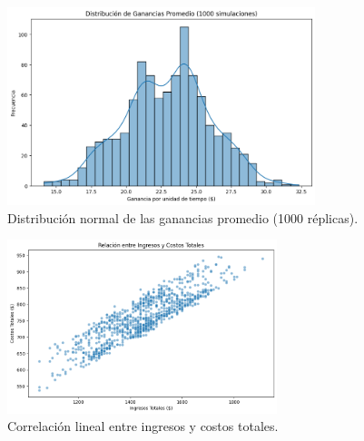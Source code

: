 \documentclass{report}
\begin{document}
\begin{figure}[h]
    \centering
    \includegraphics[width=0.8\textwidth]{distribucion_ganacias_promedio.png}
    \caption{Distribución normal de las ganancias promedio (1000 réplicas).}
\end{figure}

\begin{figure}[h]
    \centering
    \includegraphics[width=0.7\textwidth]{ingresos-costos_totales.png}
    \caption{Correlación lineal entre ingresos y costos totales.}
\end{figure}
\end{document}
